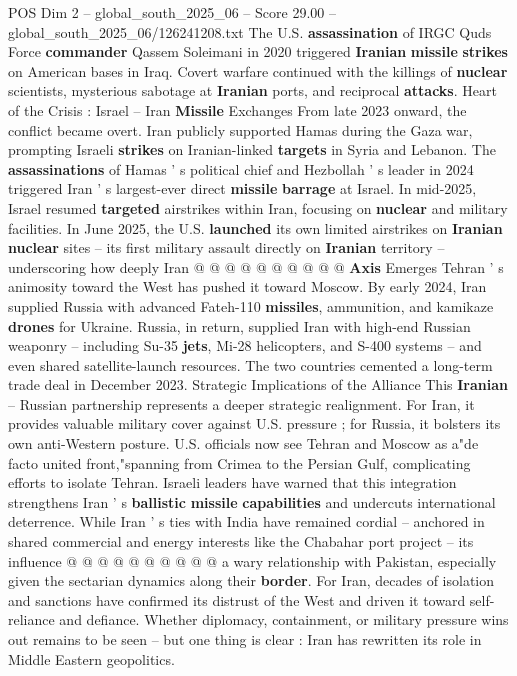 \begin{textsample}{POS Dim 2 – global\_south\_2025\_06 – Score 29.00 – global\_south\_2025\_06/126241208.txt}
The U.S. \textbf{assassination} of IRGC Quds Force \textbf{commander} Qassem Soleimani in 2020 triggered \textbf{Iranian} \textbf{missile} \textbf{strikes} on American bases in Iraq.
Covert warfare continued with the killings of \textbf{nuclear} scientists, mysterious sabotage at \textbf{Iranian} ports, and reciprocal \textbf{attacks}.
Heart of the Crisis : Israel -- Iran \textbf{Missile} Exchanges From late 2023 onward, the conflict became overt.
Iran publicly supported Hamas during the Gaza war, prompting Israeli \textbf{strikes} on Iranian-linked \textbf{targets} in Syria and Lebanon.
The \textbf{assassinations} of Hamas ' s political chief and Hezbollah ' s leader in 2024 triggered Iran ' s largest-ever direct \textbf{missile} \textbf{barrage} at Israel.
In mid-2025, Israel resumed \textbf{targeted} airstrikes within Iran, focusing on \textbf{nuclear} and military facilities.
In June 2025, the U.S. \textbf{launched} its own limited airstrikes on \textbf{Iranian} \textbf{nuclear} sites -- its first military assault directly on \textbf{Iranian} territory -- underscoring how deeply Iran @ @ @ @ @ @ @ @ @ @ \textbf{Axis} Emerges Tehran ' s animosity toward the West has pushed it toward Moscow.
By early 2024, Iran supplied Russia with advanced Fateh-110 \textbf{missiles}, ammunition, and kamikaze \textbf{drones} for Ukraine.
Russia, in return, supplied Iran with high-end Russian weaponry -- including Su-35 \textbf{jets}, Mi-28 helicopters, and S-400 systems -- and even shared satellite-launch resources.
The two countries cemented a long-term trade deal in December 2023.
Strategic Implications of the Alliance This \textbf{Iranian} -- Russian partnership represents a deeper strategic realignment.
For Iran, it provides valuable military cover against U.S. pressure ; for Russia, it bolsters its own anti-Western posture.
U.S. officials now see Tehran and Moscow as a"de facto united front,"spanning from Crimea to the Persian Gulf, complicating efforts to isolate Tehran.
Israeli leaders have warned that this integration strengthens Iran ' s \textbf{ballistic} \textbf{missile} \textbf{capabilities} and undercuts international deterrence.
While Iran ' s ties with India have remained cordial -- anchored in shared commercial and energy interests like the Chabahar port project -- its influence @ @ @ @ @ @ @ @ @ @ a wary relationship with Pakistan, especially given the sectarian dynamics along their \textbf{border}.
For Iran, decades of isolation and sanctions have confirmed its distrust of the West and driven it toward self-reliance and defiance.
Whether diplomacy, containment, or military pressure wins out remains to be seen -- but one thing is clear : Iran has rewritten its role in Middle Eastern geopolitics.

\end{textsample}

